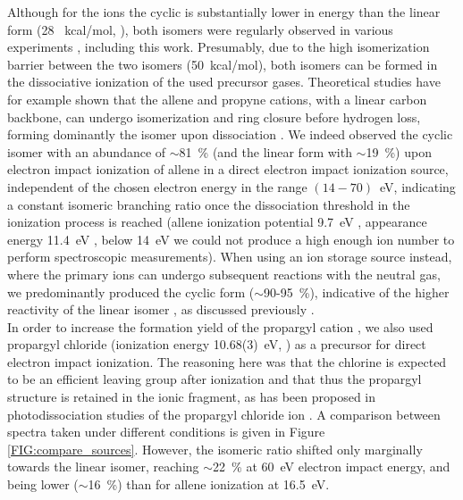 Although for the \iso ions the cyclic \cyc is substantially lower in energy than the linear \lin form  (28 ~kcal/mol,  \citep{HTL2011}), both isomers were regularly observed in various experiments \citep{RDS2010, Wyss2001, DRM2002}, including this work. Presumably, due to the high isomerization barrier between the two isomers (50~kcal/mol),  both isomers can be formed in the dissociative ionization of the used precursor gases. Theoretical studies have for example shown that the allene and propyne cations, with a linear carbon backbone, can undergo isomerization and ring closure before hydrogen loss, forming dominantly the \cyc isomer upon dissociation \citep{FS1983,MB2008}. 
We indeed observed the cyclic isomer with an abundance of $\sim$81~\% (and the linear form with $\sim$19~\%) upon electron impact ionization of allene in a direct electron impact ionization source, independent of the chosen electron energy in the range $(14-70)$~eV, indicating a constant isomeric branching ratio once the dissociation threshold in the ionization process is reached (allene ionization potential 9.7~eV \citep{YWL1990}, \iso appearance energy 11.4~eV \citep{LOSSING1972}, below 14~eV we could not produce a high enough \iso ion number to perform spectroscopic measurements). When using an ion storage source instead, where the primary ions can undergo subsequent reactions with the neutral gas, we predominantly produced the cyclic form ($\sim$90-95~\%), indicative of the higher reactivity of the linear isomer \linn,  as discussed previously \citep{SLA1982,MMF1994}.\\

In order to increase the formation yield of the propargyl cation \linn, we also used propargyl chloride (ionization energy 10.68(3)~eV, \citep{TWB1975}) as a precursor for direct electron impact ionization. The reasoning here was that the chlorine is expected to be an efficient leaving group after ionization and that thus the propargyl structure is retained in the \iso ionic fragment, as has been proposed in photodissociation studies of the propargyl chloride ion \citep{KR1985}. A comparison between spectra taken under different conditions is given in Figure \ref{FIG:compare_sources}. However, the isomeric ratio shifted only marginally towards the linear isomer, reaching $\sim$22~\% at 60~eV electron impact energy, and being lower ($\sim$16~\%) than for allene ionization at 16.5~eV. \\


